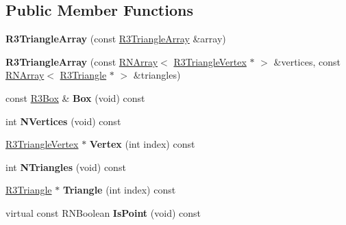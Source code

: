 \subsection*{Public Member Functions}
\begin{DoxyCompactItemize}
\item 
{\bfseries R3\+Triangle\+Array} (const \hyperlink{class_r3_triangle_array}{R3\+Triangle\+Array} \&array)\hypertarget{class_r3_triangle_array_ac582af694dddaa082bcb51eb6d3354ed}{}\label{class_r3_triangle_array_ac582af694dddaa082bcb51eb6d3354ed}

\item 
{\bfseries R3\+Triangle\+Array} (const \hyperlink{class_r_n_array}{R\+N\+Array}$<$ \hyperlink{class_r3_triangle_vertex}{R3\+Triangle\+Vertex} $\ast$ $>$ \&vertices, const \hyperlink{class_r_n_array}{R\+N\+Array}$<$ \hyperlink{class_r3_triangle}{R3\+Triangle} $\ast$ $>$ \&triangles)\hypertarget{class_r3_triangle_array_a037bfc94219d82faf6fe060e7055e89c}{}\label{class_r3_triangle_array_a037bfc94219d82faf6fe060e7055e89c}

\item 
const \hyperlink{class_r3_box}{R3\+Box} \& {\bfseries Box} (void) const \hypertarget{class_r3_triangle_array_abf1d0494660eaae87d8ba221fb207670}{}\label{class_r3_triangle_array_abf1d0494660eaae87d8ba221fb207670}

\item 
int {\bfseries N\+Vertices} (void) const \hypertarget{class_r3_triangle_array_afa555513bd81605056c2f383a13369cd}{}\label{class_r3_triangle_array_afa555513bd81605056c2f383a13369cd}

\item 
\hyperlink{class_r3_triangle_vertex}{R3\+Triangle\+Vertex} $\ast$ {\bfseries Vertex} (int index) const \hypertarget{class_r3_triangle_array_a476a2bbbaa92c9d8004ed6523d26a70e}{}\label{class_r3_triangle_array_a476a2bbbaa92c9d8004ed6523d26a70e}

\item 
int {\bfseries N\+Triangles} (void) const \hypertarget{class_r3_triangle_array_a3ddc25b31c4a37c8188b1c0d0e792d9a}{}\label{class_r3_triangle_array_a3ddc25b31c4a37c8188b1c0d0e792d9a}

\item 
\hyperlink{class_r3_triangle}{R3\+Triangle} $\ast$ {\bfseries Triangle} (int index) const \hypertarget{class_r3_triangle_array_a560ec963cce411efb4add3184fd13a85}{}\label{class_r3_triangle_array_a560ec963cce411efb4add3184fd13a85}

\item 
virtual const R\+N\+Boolean {\bfseries Is\+Point} (void) const \hypertarget{class_r3_triangle_array_aadd73c567b9932cb8151a185c9ad75d9}{}\label{class_r3_triangle_array_aadd73c567b9932cb8151a185c9ad75d9}


\end{DoxyCompactItemize}
